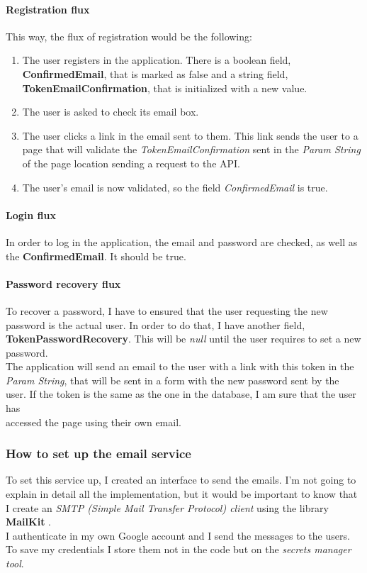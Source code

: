             \paragraph{Registration flux}
                This way, the flux of registration would be the following:
                \begin{enumerate}
                    \item The user registers in the application. There is a boolean field, \textbf{ConfirmedEmail}, that is marked as false and a string field, \textbf{TokenEmailConfirmation}, that is initialized with a new value.
                    \item The user is asked to check its email box.
                    \item The user clicks a link in the email sent to them. This link sends the user to a page that will validate the \textit{TokenEmailConfirmation} sent in the \textit{Param String} of the page location sending a request to the API.
                    \item The user's email is now validated, so the field \textit{ConfirmedEmail} is true. 
                \end{enumerate}

            \paragraph{Login flux}
                In order to log in the application, the email and password are checked, as well as the \textbf{ConfirmedEmail}. It should be true.

            \paragraph{Password recovery flux}
                To recover a password, I have to ensured that the user requesting the new password is the actual user. In order to do that, I have another field, \textbf{TokenPasswordRecovery}. This will be \textit{null} until the user requires to set a new password. \\
                The application will send an email to the user with a link with this token in the \textit{Param String}, that will be sent in a form with the new password sent by the user. If the token is the same as the one in the database, I am sure that the user has \\
                accessed the page using their own email.

        \subsubsection{How to set up the email service}
            To set this service up, I created an interface to send the emails. I'm not going to explain in detail all the implementation, but it would be important to know that I create an \textit{SMTP (Simple Mail Transfer Protocol) client} using the library \textbf{MailKit} \cite{MailKit}. \\
            I authenticate in my own Google account and I send the messages to the users. To save my credentials I store them not in the code but on the \textit{secrets manager tool}.

